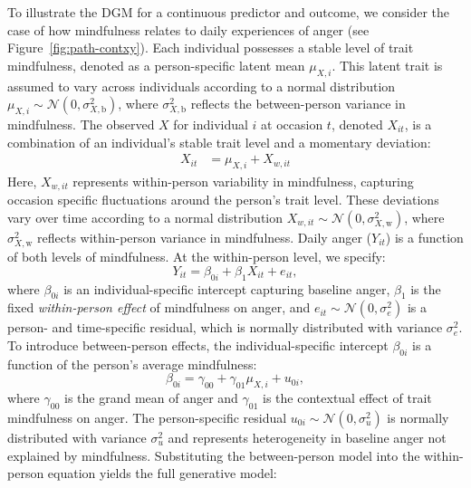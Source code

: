 To illustrate the DGM for a continuous predictor and outcome, we consider the case of how mindfulness relates to daily experiences of anger (see Figure~\ref{fig:path-contxy}). Each individual possesses a stable level of trait mindfulness, denoted as a person-specific latent mean \( \mu_{X,i} \). This latent trait is assumed to vary across individuals according to a normal distribution $\mu_{X,i} \sim \mathcal{N}(0, \sigma^2_{X,\text{b}})$, where \( \sigma^2_{X,\text{b}} \) reflects the between-person variance in mindfulness. The observed $X$ for individual \( i \) at occasion \( t \), denoted \( X_{it} \), is a combination of an individual's stable trait level and a momentary deviation:
\begin{align}
    \label{eqn:relationwithinmundlak}
    X_{it} &= \mu_{X,i} + X_{w,it}
\end{align}
Here, \( X_{w,it} \) represents within-person variability in mindfulness, capturing occasion specific fluctuations around the person’s trait level. These deviations vary over time according to a normal distribution \( X_{w,it} \sim \mathcal{N}(0, \sigma^2_{X,\text{w}}) \), where \( \sigma^2_{X,\text{w}} \) reflects within-person variance in mindfulness. Daily anger (\( Y_{it} \)) is a function of both levels of mindfulness. At the within-person level, we specify:
\begin{equation}
    \label{eqn:yit-generationmlm}
    Y_{it} = \beta_{0i} + \beta_{1} X_{it} + e_{it},
\end{equation}
where \( \beta_{0i} \) is an individual-specific intercept capturing baseline anger, \( \beta_1 \) is the fixed \textit{within-person effect} of mindfulness on anger, and \( e_{it} \sim \mathcal{N}(0, \sigma^2_e) \) is a person- and time-specific residual, which is normally distributed with variance $\sigma^2_e$. To introduce between-person effects, the individual-specific intercept \( \beta_{0i} \) is a function of the person’s average mindfulness:
\begin{equation}
    \label{eqn:beta0-generationcontxy}
    \beta_{0i} = \gamma_{00} + \gamma_{01} \mu_{X,i} + u_{0i},
\end{equation}
where \( \gamma_{00} \) is the grand mean of anger and \( \gamma_{01} \) is the contextual effect of trait mindfulness on anger. The person-specific residual \( u_{0i} \sim \mathcal{N}(0, \sigma^2_u) \) is normally distributed with variance \( \sigma^2_u \) and represents heterogeneity in baseline anger not explained by mindfulness. Substituting the between-person model into the within-person equation yields the full generative model:

